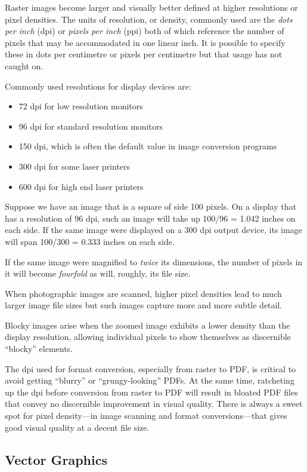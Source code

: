 \documentclass[
  11pt,
  british,
  a4paper,
]{article}
\providecommand{\tightlist}{%
  \setlength{\itemsep}{0pt}\setlength{\parskip}{0pt}}
\begin{document}
Raster images become larger and visually better defined at higher
resolutions or pixel densities. The units of resolution, or density,
commonly used are the \emph{dots per inch} (dpi) or \emph{pixels per
inch} (ppi) both of which reference the number of pixels that may be
accommodated in one linear inch. It is possible to specify these in dots
per centimetre or pixels per centimetre but that usage has not caught
on.

Commonly used resolutions for display devices are:

\begin{itemize}
\tightlist
\item
  72 dpi for low resolution monitors
\item
  96 dpi for standard resolution monitors
\item
  150 dpi, which is often the default value in image conversion programs
\item
  300 dpi for some laser printers
\item
  600 dpi for high end laser printers
\end{itemize}

Suppose we have an image that is a square of side 100 pixels. On a
display that has a resolution of 96 dpi, such an image will take up
100/96 = 1.042 inches on each side. If the same image were displayed on
a 300 dpi output device, its image will span 100/300 = 0.333 inches on
each side.

If the same image were magnified to \emph{twice} its dimensions, the
number of pixels in it will become \emph{fourfold} as will, roughly, its
file size.

When photographic images are scanned, higher pixel densities lead to
much larger image file sizes but such images capture more and more
subtle detail.

Blocky images arise when the zoomed image exhibits a lower density than
the display resolution, allowing individual pixels to show themselves as
discernible ``blocky'' elements.

The dpi used for format conversion, especially from raster to PDF, is
critical to avoid getting ``blurry'' or ``grungy-looking'' PDFs. At the
same time, ratcheting up the dpi before conversion from raster to PDF
will result in bloated PDF files that convey no discernible improvement
in visual quality. There is always a sweet spot for pixel density---in
image scanning and format conversions---that gives good visual quality
at a decent file size.

\hypertarget{vector-graphics}{%
\subsection{Vector Graphics}\label{vector-graphics}}
\end{document}
